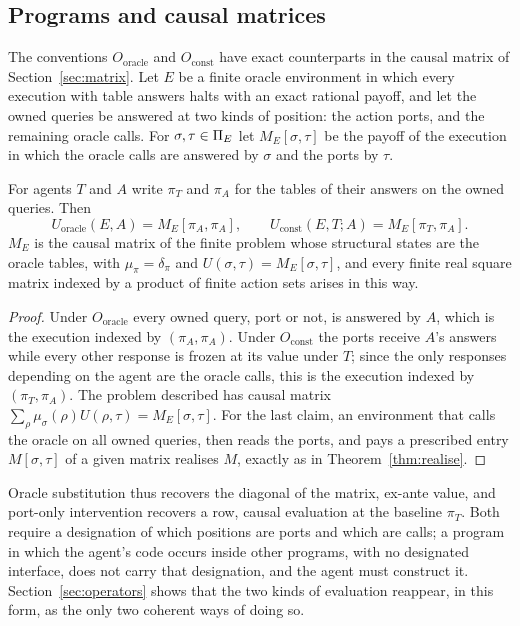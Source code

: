 \subsection{Programs and causal matrices}

The conventions $O_{\mathrm{oracle}}$ and $O_{\mathrm{const}}$ have exact counterparts in the
causal matrix of Section~\ref{sec:matrix}. Let $E$ be a finite oracle environment in which every
execution with table answers halts with an exact rational payoff, and let the owned queries be
answered at two kinds of position: the action ports, and the remaining oracle calls. For
$\sigma,\tau\in\Pi_E$ let $M_E[\sigma,\tau]$ be the payoff of the execution in which the oracle
calls are answered by $\sigma$ and the ports by $\tau$.

\begin{proposition}\label{prop:progmatrix}
For agents $T$ and $A$ write $\pi_T$ and $\pi_A$ for the tables of their answers on the owned
queries. Then
\[
  U_{\mathrm{oracle}}(E,A)=M_E[\pi_A,\pi_A],\qquad
  U_{\mathrm{const}}(E,T;A)=M_E[\pi_T,\pi_A].
\]
$M_E$ is the causal matrix of the finite problem whose structural states are the oracle tables,
with $\mu_\pi=\delta_\pi$ and $U(\sigma,\tau)=M_E[\sigma,\tau]$, and every finite real square matrix
indexed by a product of finite action sets arises in this way.
\end{proposition}

\begin{proof}
Under $O_{\mathrm{oracle}}$ every owned query, port or not, is answered by $A$, which is the
execution indexed by $(\pi_A,\pi_A)$. Under $O_{\mathrm{const}}$ the ports receive $A$'s answers
while every other response is frozen at its value under $T$; since the only responses depending on
the agent are the oracle calls, this is the execution indexed by $(\pi_T,\pi_A)$. The problem
described has causal matrix $\sum_\rho\mu_\sigma(\rho)U(\rho,\tau)=M_E[\sigma,\tau]$. For the last
claim, an environment that calls the oracle on all owned queries, then reads the ports, and pays a
prescribed entry $M[\sigma,\tau]$ of a given matrix realises $M$, exactly as in
Theorem~\ref{thm:realise}.
\end{proof}

Oracle substitution thus recovers the diagonal of the matrix, ex-ante value, and port-only
intervention recovers a row, causal evaluation at the baseline $\pi_T$. Both require a designation
of which positions are ports and which are calls; a program in which the agent's code occurs inside
other programs, with no designated interface, does not carry that designation, and the agent must
construct it. Section~\ref{sec:operators} shows that the two kinds of evaluation reappear, in this
form, as the only two coherent ways of doing so.

